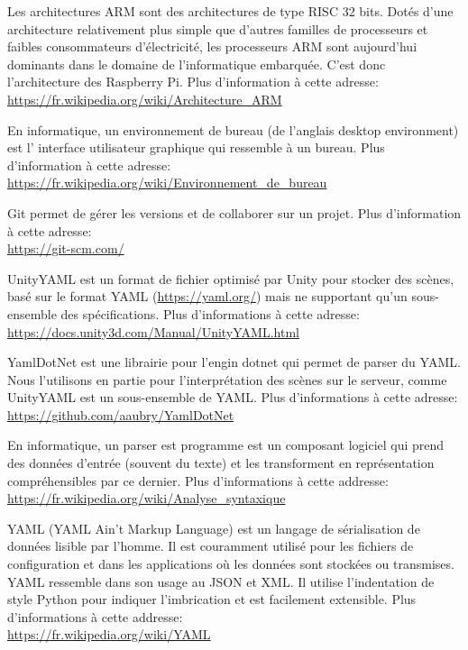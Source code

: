 \documentclass[a4paper]{article}
\begin{document}
\begin{thebibliography}{}
      Les architectures ARM sont des architectures de type RISC 32 bits. Dotés d'une architecture relativement plus simple que d'autres familles de processeurs et faibles consommateurs d'électricité, les processeurs ARM sont aujourd'hui dominants dans le domaine de l'informatique embarquée. C'est donc l'architecture des Raspberry Pi.
      Plus d'information à cette adresse:\\
      \url{https://fr.wikipedia.org/wiki/Architecture_ARM}
      
 	En informatique, un environnement de bureau (de l'anglais desktop environment) est l' interface utilisateur graphique qui ressemble à un bureau. 
    Plus d'information à cette adresse: \\
    \url{https://fr.wikipedia.org/wiki/Environnement_de_bureau}

    Git permet de gérer les versions et de collaborer sur un projet. Plus d'information à cette adresse: \\
    \url{https://git-scm.com/}

    UnityYAML est un format de fichier optimisé par Unity pour stocker des scènes, basé sur le format YAML (\url{https://yaml.org/}) mais ne supportant qu'un sous-ensemble des spécifications. Plus d'informations à cette adresse: \\
    \url{https://docs.unity3d.com/Manual/UnityYAML.html}
    
    YamlDotNet est une librairie pour l'engin dotnet qui permet de parser du YAML. Nous l'utilisons en partie pour l'interprétation des scènes sur le serveur, comme UnityYAML\cite{unityyaml} est un sous-ensemble de YAML. Plus d'informations à cette adresse: \\
    \url{https://github.com/aaubry/YamlDotNet}
    
	En informatique, un parser est programme est un composant logiciel qui prend des données d'entrée (souvent du texte) et les transforment en représentation compréhensibles par ce dernier. Plus d'informations à cette addresse: \\
    \url{https://fr.wikipedia.org/wiki/Analyse_syntaxique}
    
	YAML (YAML Ain't Markup Language) est un langage de sérialisation de données lisible par l'homme. Il est couramment utilisé pour les fichiers de configuration et dans les applications où les données sont stockées ou transmises. YAML ressemble dans son usage au JSON et XML. Il utilise l'indentation de style Python pour indiquer l'imbrication et est facilement extensible. Plus d'informations à cette addresse: \\
    \url{https://fr.wikipedia.org/wiki/YAML}
    

\end{thebibliography}
\end{document}
